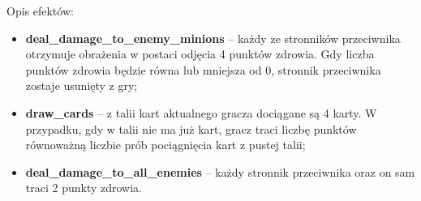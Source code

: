 Opis efektów:

\begin{itemize}
	\item \textbf{deal\_damage\_to\_enemy\_minions} -- każdy ze stronników przeciwnika otrzymuje obrażenia w postaci odjęcia 4 punktów zdrowia. Gdy liczba punktów zdrowia będzie równa lub mniejsza od 0, stronnik przeciwnika zostaje usunięty z gry;
	\item \textbf{draw\_cards} -- z talii kart aktualnego gracza dociągane są 4 karty. W przypadku, gdy w talii nie ma już kart, gracz traci liczbę punktów równoważną liczbie prób pociągnięcia kart z pustej talii;
	\item \textbf{deal\_damage\_to\_all\_enemies} -- każdy stronnik przeciwnika oraz on sam traci 2 punkty zdrowia.
\end{itemize}